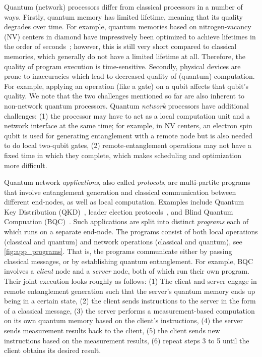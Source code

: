 Quantum (network) processors differ from classical processors in a number of ways.
Firstly, quantum memory has limited lifetime, meaning that its quality degrades over time.
For example, quantum memories based on nitrogen-vacancy (NV) centers in diamond have impressively been optimized to achieve lifetimes in the order of seconds~\cite{Abobeih2018};
however, this is still very short compared to classical memories, which generally do not have a limited lifetime at all.
Therefore, the quality of program execution is time-sensitive.
Secondly, physical devices are prone to inaccuracies which lead to decreased quality of (quantum) computation.
For example, applying an operation (like a gate) on a qubit affects that qubit's quality.
We note that the two challenges mentioned so far are also inherent to non-network quantum processors.
Quantum \textit{network} processors have additional challenges:
    (1) the processor may have to act as a local computation unit and a network interface at the same time;
    for example, in NV centers, an electron spin qubit is used for generating entanglement with a remote node but is also needed to do local two-qubit gates,
    (2) remote-entanglement operations may not have a fixed time in which they complete, which makes scheduling and optimization more difficult.

Quantum network \textit{applications}, also called \textit{protocols}, are multi-partite programs that involve entanglement generation and classical communication between different end-nodes, as well as local computation.
Examples include Quantum Key Distribution (QKD)~\cite{bb84, ekert1991quantum}, leader election protocols~\cite{kobayashi2014simpler, ganz2009quantum}, and Blind Quantum Compuation (BQC)~\cite{Wehner2018stages}.
Such applications are split into distinct \textit{programs} each of which runs on a separate end-node.
The programs consist of both local operations (classical and quantum) and network operations (classical and quantum), see \cref{fig:app_programs}.
That is, the programs communicate either by passing classical messages, or by establishing quantum entanglement.
For example, BQC involves a \textit{client} node and a \textit{server} node, both of which run their own program.
Their joint execution looks roughly as follows:
    (1) The client and server engage in remote entanglement generation such that the server's quantum memory ends up being in a certain state,
    (2) the client sends instructions to the server in the form of a classical message,
    (3) the server performs a measurement-based computation on its own quantum memory based on the client's instructions,
    (4) the server sends measurement results back to the client,
    (5) the client sends new instructions based on the measurement results,
    (6) repeat steps 3 to 5 until the client obtains its desired result.

